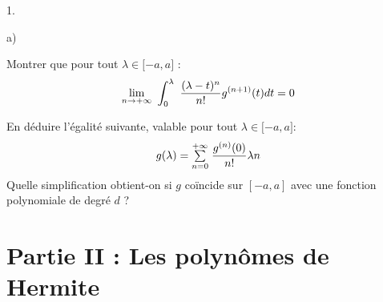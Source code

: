 \documentclass[11pt]{article}%
\begin{document}
\begin{noliste}{1.}
\begin{noliste}{a)}
 \setlength{\itemsep}{2mm}
\item Montrer que pour tout $\lambda {}\in \lbrack -a,a]$ : 
\[
{\displaystyle \lim_{n\rightarrow + \infty } \ }\displaystyle \int_{0}^{\lambda {}}\ {\dfrac{(\lambda
{}-t)^{n}}{n!}}g^{(n + 1)}(t)dt = 0
\]

\item En déduire l'égalité suivante, valable pour tout $\lambda {}\in
\lbrack -a,a] :$ 
\[
g(\lambda {}) = {\textstyle\sum\limits_{n = 0}^{+ \infty }}\hspace{.1cm}{\dfrac{g^{(n)}(0)}{n!}}\lambda
{}{n}
\]
Quelle simplification obtient-on si $g$ coïncide sur $[-a,a]$ avec une
fonction polynomiale de degré $d$ ?
\end{noliste}
\end{noliste}

\section*{Partie II : Les polynômes de Hermite}
\end{document}
